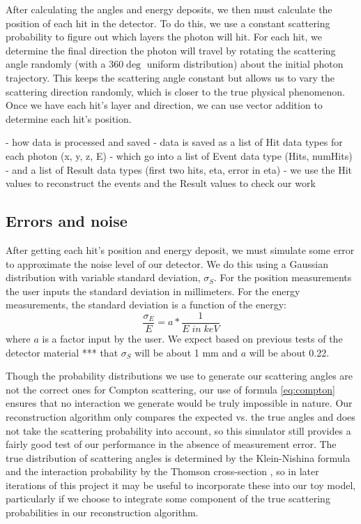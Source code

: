 After calculating the angles and energy deposits, we then must calculate the position of each hit in the detector. To do this, we use a constant scattering probability to figure out which layers the photon will hit. For each hit, we determine the final direction the photon will travel by rotating the scattering angle randomly (with a 360$\deg$ uniform distribution) about the initial photon trajectory. This keeps the scattering angle constant but allows us to vary the scattering direction randomly, which is closer to the true physical phenomenon. Once we have each hit's layer and direction, we can use vector addition to determine each hit's position.

- how data is processed and saved
    - data is saved as a list of Hit data types for each photon (x, y, z, E)
    - which go into a list of Event data type (Hits, numHits)
    - and a list of Result data types (first two hits, eta, error in eta)
    - we use the Hit values to reconstruct the events and the Result values to check our work

\subsection{Errors and noise}
After getting each hit's position and energy deposit, we must simulate some error to approximate the noise level of our detector. We do this using a Gaussian distribution with variable standard deviation, $\sigma_S$. For the position measurements the user inputs the standard deviation in millimeters. For the energy measurements, the standard deviation is a function of the energy:
\begin{equation}
\frac{\sigma_E}{E} = a*\frac{1}{E \; in \; keV}
\end{equation}
where $a$ is a factor input by the user. We expect based on previous tests of the detector material \cite{}*** that $\sigma_S$ will be about 1 mm and $a$ will be about 0.22.

Though the probability distributions we use to generate our scattering angles are not the correct ones for Compton scattering, our use of formula \ref{eq:compton} ensures that no interaction we generate would be truly impossible in nature. Our reconstruction algorithm only compares the expected vs. the true angles and does not take the scattering probability into account, so this simulator still provides a fairly good test of our performance in the absence of measurement error. The true distribution of scattering angles is determined by the Klein-Nishina formula and the interaction probability by the Thomson cross-section \cite{klein-nishina}, so in later iterations of this project it may be useful to incorporate these into our toy model, particularly if we choose to integrate some component of the true scattering probabilities in our reconstruction algorithm.

